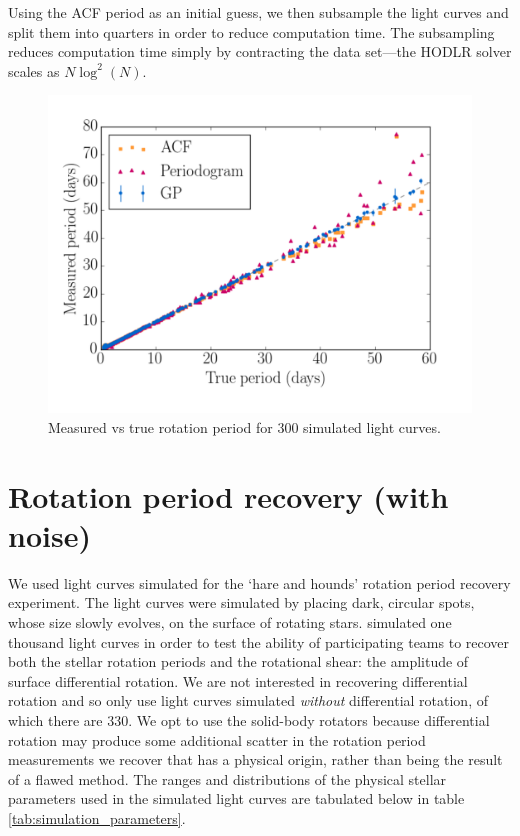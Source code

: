 Using the ACF period as an initial guess, we then subsample the light curves
and split them into \kepler quarters in order to reduce computation time.
The subsampling reduces computation time simply by contracting the data
set---the HODLR solver scales as $N \log ^2 (N)$.

\begin{figure}
\begin{center}
\includegraphics[width=6in, clip=true]{figures/compare2.pdf}
\caption{Measured vs true rotation period for 300 simulated light curves.}
\end{center}
\end{figure}
\label{fig:compare_noise_free}

\section{Rotation period recovery (with noise)}

We used light curves simulated for the \citet{aigrain15} `hare and hounds'
rotation period recovery experiment.
The light curves were simulated by placing dark, circular spots, whose size
slowly evolves, on the surface of rotating stars.
\citep{aigrain15} simulated one thousand light curves in order to test the
ability of participating teams to recover both the stellar rotation periods
and the rotational shear: the amplitude of surface differential rotation.
We are not interested in recovering differential rotation and so only use
light curves simulated {\it without} differential rotation, of which there are
330.
We opt to use the solid-body rotators because differential rotation may
produce some additional scatter in the rotation period measurements we recover
that has a physical origin, rather than being the result of a flawed method.
The ranges and distributions of the physical stellar parameters used in the
simulated light curves are tabulated below in table
\ref{tab:simulation_parameters}.

